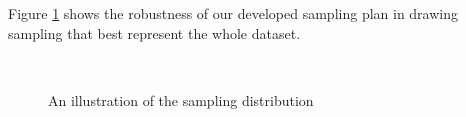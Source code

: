 \documentclass[11pt, letterpaper]{article}
\begin{document}
Figure \ref{fig:halton} shows the robustness of our developed sampling plan in drawing sampling that best represent the whole dataset.

\begin{figure}[!h]
	\begin{center}
		\vspace{-10pt}
		\mbox{  
			 }
		\caption{An illustration of the sampling distribution}
		\label{fig:halton}
	\end{center}
\end{figure}
\end{document}

